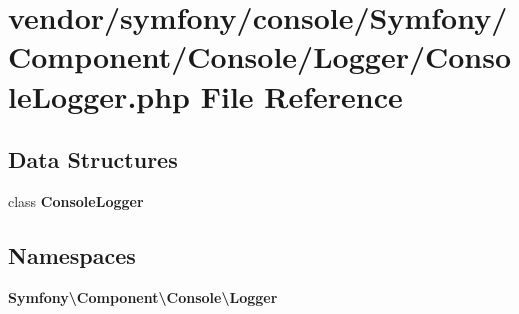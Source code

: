 \section{vendor/symfony/console/\+Symfony/\+Component/\+Console/\+Logger/\+Console\+Logger.php File Reference}
\label{_console_logger_8php}
\subsection*{Data Structures}
\begin{DoxyCompactItemize}
\item 
class {\bf Console\+Logger}
\end{DoxyCompactItemize}
\subsection*{Namespaces}
\begin{DoxyCompactItemize}
\item 
 {\bf Symfony\textbackslash{}\+Component\textbackslash{}\+Console\textbackslash{}\+Logger}
\end{DoxyCompactItemize}
